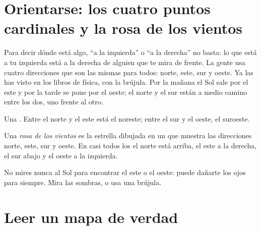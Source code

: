 \section{Orientarse: los cuatro puntos cardinales y la rosa de los vientos}

Para decir dónde está algo, ``a la izquierda'' o ``a la derecha'' no basta:
lo que está a tu izquierda está a la derecha de alguien que te mira de
frente. La gente usa cuatro direcciones que son las mismas para todos:
norte, este, sur y oeste. Ya las has visto en los libros de física, con la
brújula. Por la mañana el Sol sale por el este y por la tarde se pone por el
oeste; el norte y el sur están a medio camino entre los dos, uno frente al
otro.

\begin{omfigure}

{\small Una . Entre el norte y el este está el noreste;
entre el sur y el oeste, el suroeste.}
\label{fig:g2:drawing-to-map:rose}
\end{omfigure}

\begin{definition}\label{def:g2:drawing-to-map:directions}
Una \emph{rosa de los vientos} es la estrella
dibujada en un  que muestra las direcciones norte, este, sur y oeste. En
casi todos los  el norte está arriba, el este a la derecha, el sur
abajo y el oeste a la izquierda.
\end{definition}

\begin{safety}
No mires nunca al Sol para encontrar el este o el oeste: puede dañarte los
ojos para siempre. Mira las sombras, o usa una brújula.
\end{safety}

\section{Leer un mapa de verdad}

